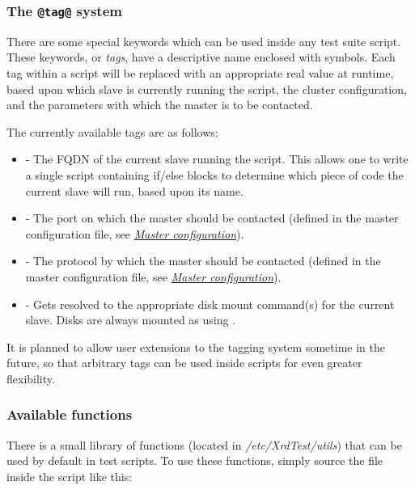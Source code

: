 \documentclass[a4paper,11pt,openany]{sphinxmanual}
\begin{document}
\subsubsection{The \texttt{@tag@} system}
\label{testsuites:the-tag-system}\label{testsuites:tagging}
There are some special keywords which can be used inside any test suite script.
These keywords, or \emph{tags}, have a descriptive name enclosed with  symbols.
Each tag within a script will be replaced with an appropriate real value at
runtime, based upon which slave is currently running the script, the cluster
configuration, and the parameters with which the master is to be contacted.

The currently available tags are as follows:
\begin{itemize}
\item {} 
 - The FQDN of the current slave running the script. This allows
one to write a single script containing if/else blocks to determine which piece
of code the current slave will run, based upon its name.

\item {} 
 - The port on which the master should be contacted (defined in the
master configuration file, see {\hyperref[config-master::doc]{\emph{Master configuration}}}).

\item {} 
 - The protocol by which the master should be contacted (defined in
the master configuration file, see {\hyperref[config-master::doc]{\emph{Master configuration}}}).

\item {} 
 - Gets resolved to the appropriate disk mount command(s) for
the current slave. Disks are always mounted as  using .

\end{itemize}

It is planned to allow user extensions to the tagging system sometime in the
future, so that arbitrary tags can be used inside scripts for even greater
flexibility.


\subsubsection{Available functions}
\label{testsuites:functions}\label{testsuites:available-functions}
There is a small library of functions (located in \emph{/etc/XrdTest/utils}) that can
be used by default in test scripts. To use these functions, simply source the
file inside the script like this:
\end{document}
